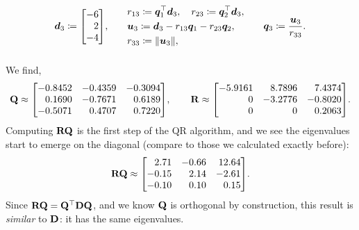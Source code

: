 \documentclass[11pt]{article}
\begin{document}
\begin{enumerate}
\[\begin{alignedat}{3}
                  \vect{d}_3
                  \coloneq
                  \begin{bmatrix*}[r]
                      -6 \\ 2 \\ -4
                  \end{bmatrix*}
                  \! ,
                  \qquad
                   &   &
                  \begin{aligned}
                       &
                      r_{13} \coloneq \vect{q}_1^\top \vect{d}_3,
                      \quad
                      r_{23} \coloneq \vect{q}_2^\top \vect{d}_3,
                      \\
                       &
                      \vect{u}_3
                      \coloneq
                      \vect{d}_3
                      - r_{13} \vect{q}_1
                      - r_{23} \vect{q}_2,
                      \\
                       &
                      r_{33} \coloneq \norm{\vect{u}_3},
                  \end{aligned}
                  \qquad
                   &   &
                  \vect{q}_3
                  \coloneq
                  \frac{\vect{u}_3}{r_{33}}
                  .
                  \\[1em]
              \end{alignedat}
          \]
          We find,
          \[
              \mat{Q} \approx
              \begin{bmatrix*}[r]
                  -0.8452 & -0.4359 & -0.3094 \\
                  0.1690 & -0.7671 & 0.6189 \\
                  -0.5071 & 0.4707 & 0.7220 \\
              \end{bmatrix*}
              \! ,
              \qquad
              \mat{R} \approx
              \begin{bmatrix*}[r]
                  -5.9161 & 8.7896 & 7.4374 \\
                  0 & -3.2776 & -0.8020 \\
                  0 & 0 & 0.2063 \\
              \end{bmatrix*}
              \! .
          \]
          Computing $\mathbf{R} \mathbf{Q}$ is the first step of the QR algorithm, and we see the
          eigenvalues start to emerge on the diagonal (compare to those we calculated exactly
          before):
          \[
              \mat{R} \mat{Q} \approx
              \begin{bmatrix*}[r]
                  2.71  & -0.66 & 12.64 \\
                  -0.15 & 2.14  & -2.61 \\
                  -0.10 & 0.10  & 0.15
              \end{bmatrix*}
              \! .
          \]
          Since $\mathbf{R} \mathbf{Q} = \mathbf{Q}^\top \mathbf{D} \mathbf{Q}$, and we know $\mathbf{Q}$ is
          orthogonal by construction, this result is \emph{similar} to $\mathbf{D}$: it has the same
          eigenvalues.


\end{enumerate}
\end{document}
